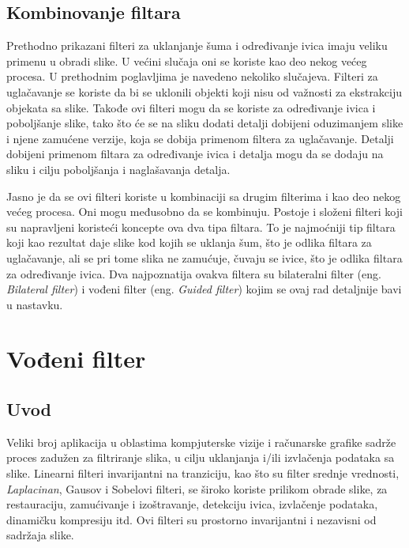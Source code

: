 \documentclass[a4paper,12pt,titlepage]{article}
\begin{document}
\subsection{Kombinovanje filtara}%

Prethodno prikazani filteri za uklanjanje šuma i određivanje ivica imaju veliku primenu u obradi slike. U većini slučaja oni se koriste kao deo nekog većeg procesa. U prethodnim poglavljima je navedeno nekoliko slučajeva. Filteri za uglačavanje se koriste da bi se uklonili objekti koji nisu od važnosti za ekstrakciju objekata sa slike. Takođe ovi filteri mogu da se koriste za određivanje ivica i poboljšanje slike, tako što će se na sliku dodati detalji dobijeni oduzimanjem slike i njene zamućene verzije, koja se dobija primenom filtera za uglačavanje. Detalji dobijeni primenom filtara za određivanje ivica i detalja mogu da se dodaju na sliku i cilju poboljšanja i naglašavanja detalja. 

Jasno je da se ovi filteri koriste u kombinaciji sa drugim filterima i kao deo nekog većeg procesa. Oni mogu međusobno da se kombinuju. Postoje i složeni filteri koji su napravljeni koristeći koncepte ova dva tipa filtara. To je najmoćniji tip filtara koji kao rezultat daje slike kod kojih se uklanja šum, što je odlika filtara za uglačavanje, ali se pri tome slika ne zamućuje, čuvaju se ivice, što je odlika filtara za određivanje ivica. Dva najpoznatija ovakva filtera su bilateralni filter (eng. \emph{Bilateral filter}) i vođeni filter (eng. \emph{Guided filter}) kojim se ovaj rad detaljnije bavi u nastavku. 

\section{Vođeni filter}\label{4}%

\subsection{Uvod}%

Veliki broj aplikacija u oblastima kompjuterske vizije i računarske grafike sadrže proces zadužen za filtriranje slika, u cilju uklanjanja i/ili izvlačenja podataka sa slike. Linearni filteri invarijantni na tranziciju, kao što su filter srednje vrednosti, \emph{Laplacinan}, Gausov i Sobelovi filteri, se široko koriste prilikom obrade slike, za restauraciju, zamućivanje i izoštravanje, detekciju ivica, izvlačenje podataka, dinamičku kompresiju itd. Ovi filteri su prostorno invarijantni i nezavisni od sadržaja slike. 
\end{document}

